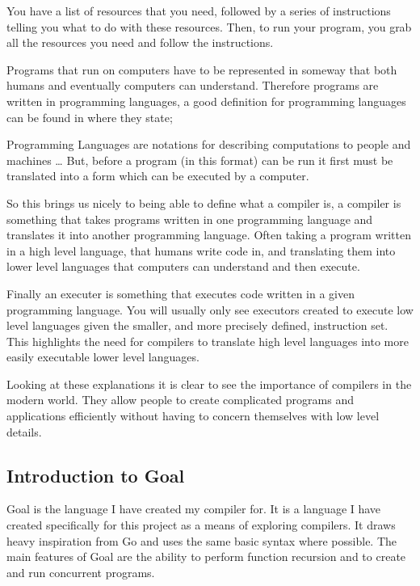 You have a list of resources that you need, followed by a series of instructions telling you what to do with these resources. Then, to run your program, you grab all the resources you need and follow the instructions.

Programs that run on computers have to be represented in someway that both humans and eventually computers can understand.  Therefore programs are written in programming languages, a good definition for programming languages can be found in  \cite[p,~1]{Comp2007}  where they state;

\begin{displayquote}
Programming Languages are notations for describing computations to people and machines … But, before a program (in this format) can be run it first must be translated into a form which can be executed by a computer.
\end{displayquote}

So this brings us nicely to being able to define what a compiler is, a compiler is something that takes programs written in one programming language and translates it into another programming language. Often taking a program written in a high level language, that humans write code in, and translating them into lower level languages that computers can understand and then execute.

Finally an executer is something that executes code written in a given programming language. You will usually only see executors created to execute low level languages given the smaller, and more precisely defined, instruction set. This highlights the need for compilers to translate high level languages into more easily executable lower level languages. 

Looking at these explanations it is clear to see the importance of compilers in the modern world. They allow people to create complicated programs and applications efficiently without having to concern themselves with low level details.

\subsection{Introduction to Goal}

Goal is the language I have created my compiler for. It is a language I have created specifically for this project as a means of exploring compilers. It draws heavy inspiration from Go and uses the same basic syntax where possible. The main features of Goal are the ability to perform function recursion and to create and run concurrent programs.


